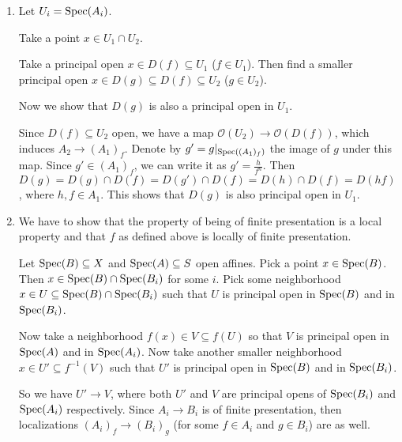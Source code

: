 \begin{exercise}{4}
    \begin{enumerate}
        \item{
                Let $U_i = \operatorname{Spec}(A_i)$.

                Take a point $x \in U_1 \cap U_2$.

                Take a principal open $x \in D(f) \subseteq U_1$ ($f \in U_1$).
                Then find a smaller principal open $x \in D(g) \subseteq D(f)
                \subseteq U_2$ ($g \in U_2$).

                Now we show that $D(g)$ is also a principal open in $U_1$.

                Since $D(f) \subseteq U_2$ open, we have a map $\mathcal{O}(U_2) \to
                \mathcal{O}(D(f))$, which induces $A_2 \to (A_1)_f$. Denote by
                $g' = g |_{\operatorname{Spec}((A_1)_f)}$ the image of $g$ under this map.
                Since $g' \in (A_1)_f$, we can write it as $g' = \frac{h}{f^n}$.
                Then $D(g) = D(g) \cap D(f) = D(g') \cap D(f) = D(h) \cap D(f) =
                D(hf)$, where $h, f \in A_1$. This shows that $D(g)$ is also
                principal open in $U_1$.
            }
        \item{
                We have to show that the property of being of finite
                presentation is a local property and that $f$ as defined above
                is locally of finite presentation.

                Let $\operatorname{Spec}(B) \subseteq X$ and $\operatorname{Spec}(A) \subseteq S$ open
                affines.
                Pick a point $x \in \operatorname{Spec}(B)$. Then $x \in \operatorname{Spec}(B) \cap
                \operatorname{Spec}(B_i)$ for some $i$. Pick some neighborhood $x \in U \subseteq \operatorname{Spec}(B) \cap
                \operatorname{Spec}(B_i)$ such that $U$ is principal open in $\operatorname{Spec}(B)$
                and in $\operatorname{Spec}(B_i)$.

                Now take a neighborhood $f(x) \in V \subseteq f(U)$ so that $V$
                is principal open in $\operatorname{Spec}(A)$ and in $\operatorname{Spec}(A_i)$.
                Now take another smaller neighborhood $x \in U' \subseteq
                f^{-1}(V)$ such that $U'$ is principal open in $\operatorname{Spec}(B)$ and in
                $\operatorname{Spec}(B_i)$.

                So we have $U' \to V$, where both $U'$ and $V$ are principal
                opens of $\operatorname{Spec}(B_i)$ and $\operatorname{Spec}(A_i)$ respectively. Since $A_i
                \to B_i$ is of finite presentation, then localizations $(A_i)_f
                \to (B_i)_g$ (for some $f \in A_i$ and $g \in B_i$) are as well.

}
\end{enumerate}
\end{exercise}
